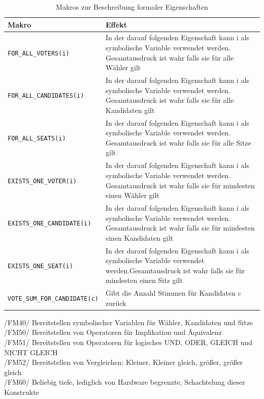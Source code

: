 \documentclass[a4paper]{scrreprt}
\begin{document}
\begin{table}[H]
\caption{Makros zur Beschreibung formaler Eigenschaften}
\begin{tabular}{|p{5cm}|p{10cm}|}
\hline 
Makro & Effekt \\
\hline 
\verb!FOR_ALL_VOTERS(i)! & In der darauf folgenden Eigenschaft kann i als symbolische Variable verwendet werden. Gesamtausdruck ist wahr falls sie für alle Wähler gilt \\
\hline 
\verb!FOR_ALL_CANDIDATES(i)! & In der darauf folgenden Eigenschaft kann i als symbolische Variable verwendet werden. Gesamtausdruck ist wahr falls sie für alle Kandidaten gilt \\
\hline 
\verb!FOR_ALL_SEATS(i)! & In der darauf folgenden Eigenschaft kann i als symbolische Variable verwendet werden. Gesamtausdruck ist wahr falls sie für alle Sitze gilt \\
\hline 
\verb!EXISTS_ONE_VOTER(i)! & In der darauf folgenden Eigenschaft kann i als symbolische Variable verwendet werden. Gesamtausdruck ist wahr falls sie für mindesten einen Wähler gilt \\
\hline 
\verb!EXISTS_ONE_CANDIDATE(i)! & In der darauf folgenden Eigenschaft kann i als symbolische Variable verwendet werden. Gesamtausdruck ist wahr falls sie für mindesten einen Kandidaten gilt \\
\hline 
\verb!EXISTS_ONE_SEAT(i)! & In der darauf folgenden Eigenschaft kann i als symbolische Variable verwendet werden.Gesamtausdruck ist wahr falls sie für mindesten einen Sitz gilt \\
\hline 
\verb!VOTE_SUM_FOR_CANDIDATE(c)! & Gibt die Anzahl Stimmen für Kandidaten c zurück\\
\hline 
\end{tabular}
\label{table:Macros_for_formal_Attributes}
\end{table}

/FM40/ Bereitstellen symbolischer Variablen für Wähler, Kandidaten und Sitze \\
/FM50/ Bereitstellen von Operatoren für Implikation und Äquivalenz \\
/FM51/ Bereitstellen von Operatoren für logisches UND, ODER, GLEICH und NICHT GLEICH \\
/FM52/ Bereitstellen von Vergleichen: Kleiner, Kleiner gleich, größer, größer gleich \\
/FM60/ Beliebig tiefe, lediglich von Hardware begrenzte, Schachtelung dieser Konstrukte \\
\end{document}
